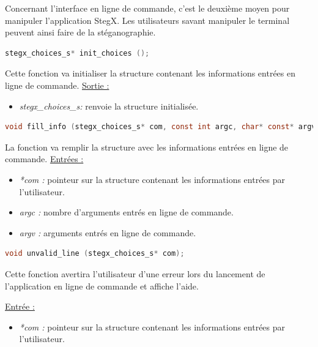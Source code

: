 \documentclass[11pt]{article}
\begin{document}
Concernant l'interface en ligne de commande, c'est le deuxième moyen pour 
manipuler l'application StegX. Les utilisateurs savant manipuler le terminal 
peuvent ainsi faire de la stéganographie. 

\begin{lstlisting}[language=c]
stegx_choices_s* init_choices ();
\end{lstlisting}

Cette fonction va initialiser la structure contenant les informations 
entrées en ligne de commande. 
\newline
\underline{Sortie :} 
\begin{itemize}
\item \textit{stegx\_choices\_s:} renvoie la structure initialisée. 
\newline 
\end{itemize}

\begin{lstlisting}[language=c]
void fill_info (stegx_choices_s* com, const int argc, char* const* argv);
\end{lstlisting}

La fonction va remplir la structure avec les informations entrées en 
ligne de commande. 
\newline
\underline{Entrées :} 
\begin{itemize}
\item \textit{*com :} pointeur sur la structure contenant les informations 
entrées par l'utilisateur. 
\item \textit{argc :} nombre d'arguments entrés en ligne de commande. 
\item \textit{argv :} arguments entrés en ligne de commande. 
\newline 
\end{itemize}

\begin{lstlisting}[language=c]
void unvalid_line (stegx_choices_s* com);
\end{lstlisting}

Cette fonction avertira l'utilisateur d'une erreur lors du lancement 
de l'application en ligne de commande et affiche l'aide. \newline

\underline{Entrée :} 
\begin{itemize}
\item \textit{*com :} pointeur sur la structure contenant les informations 
entrées par l'utilisateur. 
\newline 
\end{itemize}
\end{document}

